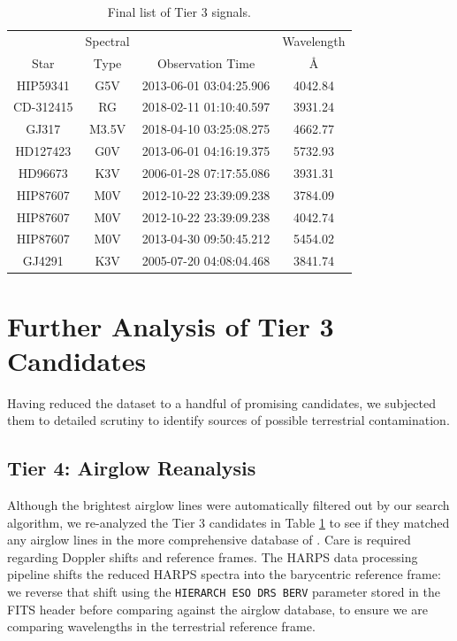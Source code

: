 \documentclass[twocolumn]{aastex701}
\begin{document}
\begin{table}
\begin{center}
\begin{tabular}{|c|c|c|c|} 
 \hline
& Spectral & & Wavelength\\
 Star & Type & Observation Time & \AA \\ 
\hline
 HIP59341 & G5V & 2013-06-01 03:04:25.906 & 4042.84\\
 CD-312415 & RG & 2018-02-11 01:10:40.597 & 3931.24\\ 
 GJ317 & M3.5V & 2018-04-10 03:25:08.275 &  4662.77\\ 
 HD127423 & G0V & 2013-06-01 04:16:19.375 &  5732.93\\
 HD96673 & K3V & 2006-01-28 07:17:55.086 & 3931.31\\
 HIP87607  & M0V & 2012-10-22 23:39:09.238 & 3784.09\\
 HIP87607  & M0V & 2012-10-22 23:39:09.238 & 4042.74\\
 HIP87607  & M0V & 2013-04-30 09:50:45.212 & 5454.02\\
 GJ4291 & K3V & 2005-07-20 04:08:04.468 & 3841.74\\
 \hline
 \end{tabular}
\end{center}
\caption{Final list of Tier 3 signals.}
\label{table:tier_3_candidates}
\end{table}

\section{Further Analysis of Tier 3 Candidates}

Having reduced the dataset to a handful of promising candidates, we subjected them to detailed scrutiny to identify sources of possible terrestrial contamination.

\subsection{Tier 4: Airglow Reanalysis}
\label{s:airglow_reanalysis}

Although the brightest airglow lines were automatically filtered out by our search algorithm, we re-analyzed the Tier 3 candidates in Table \ref{table:tier_3_candidates} to see if they matched any airglow lines in the more comprehensive database of \cite{faint_airglow_database}.  Care is required regarding Doppler shifts and reference frames. The HARPS data processing pipeline shifts the reduced HARPS spectra into the barycentric reference frame: we reverse that shift using the \texttt{HIERARCH ESO DRS BERV} parameter stored in the FITS header before comparing against the airglow database, to ensure we are comparing wavelengths in the terrestrial reference frame.
\end{document}
